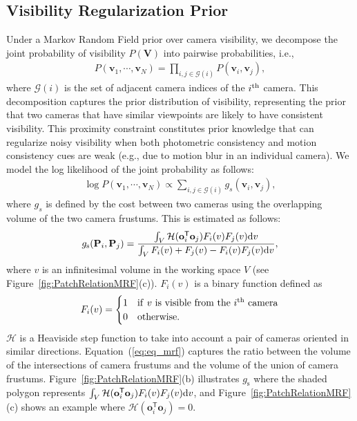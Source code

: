 \documentclass[10pt,twocolumn,letterpaper]{article}
\begin{document}
\subsection{Visibility Regularization Prior} \label{sub:prior}
Under a Markov Random Field prior over camera visibility, we decompose the joint probability of visibility $P(\mathbf{V})$ into pairwise probabilities, i.e.,
\begin{eqnarray}
P(\mathbf{v}_1, \cdots, \mathbf{v}_N)= \prod_{i,j \in \mathcal{G}(i)} P(\mathbf{v}_i, \mathbf{v}_j),
\end{eqnarray}
where $\mathcal{G}(i)$ is the set of adjacent camera indices of the $i^{\rm th}$ camera. This decomposition captures the prior distribution of visibility, representing the prior that two cameras that have similar viewpoints are likely to have consistent visibility. This proximity constraint constitutes prior knowledge that can regularize noisy visibility when both photometric consistency and motion consistency cues are weak (e.g., due to motion blur in an individual camera). We model the log likelihood of the joint probability as follows:
\begin{eqnarray}
\log P(\mathbf{v}_1, \cdots, \mathbf{v}_N) \propto \sum_{i,j \in \mathcal{G}(i)} g_s (\mathbf{v}_i,\mathbf{v}_j),
\label{eq:eq_mrf}
\end{eqnarray}
where $g_s$ is defined by the cost between two cameras using the overlapping volume of the two camera frustums. This is estimated as follows:
\begin{eqnarray}
g_\textrm{s}(\mathbf{P}_i,\mathbf{P}_j) = \frac{\int_V \mathcal{H} (\mathbf{o}_i^{\mathsf{T}} \mathbf{o}_j) F_i(v) F_j(v) {\rm d}v} {\int_V F_i(v) + F_j(v) - F_i(v)F_j(v) {\rm d}v}, 
\end{eqnarray}
where $v$ is an infinitesimal volume in the working space $V$ (see Figure~\ref{fig:PatchRelationMRF}(c)). $F_i(v)$ is a binary function defined as 
\begin{eqnarray}
F_i(v) = \begin{cases} 1 & {\rm if~}v~{\rm is~visible~from~the~}i^{\rm th} {\rm~camera}
					\\ 0 & {\rm otherwise.}
		\end{cases}
\end{eqnarray}
$\mathcal{H}$ is a Heaviside step function to take into account a pair of cameras oriented in similar directions. Equation~(\ref{eq:eq_mrf}) captures the ratio between the volume of the intersections of camera frustums and the volume of the union of camera frustums. Figure~\ref{fig:PatchRelationMRF}(b) illustrates $g_\textrm{s}$ where the shaded polygon represents $\int_V \mathcal{H} (\mathbf{o}_i^{\mathsf{T}} \mathbf{o}_j) F_i(v) F_j(v) {\rm d}v$, and Figure~\ref{fig:PatchRelationMRF}(c) shows an example where $\mathcal{H} (\mathbf{o}_i^{\mathsf{T}} \mathbf{o}_j)=0$.
\end{document}
